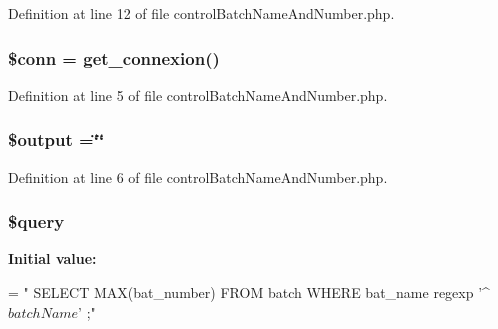 Definition at line 12 of file control\-Batch\-Name\-And\-Number.\-php.

\hypertarget{control_batch_name_and_number_8php_aa8a5a87b9c1a6a0819b88447cbe41877}{
\subsubsection[{\$conn}]{\setlength{\rightskip}{0pt plus 5cm}\$conn = {\bf get\-\_\-connexion}()}}\label{control_batch_name_and_number_8php_aa8a5a87b9c1a6a0819b88447cbe41877}


Definition at line 5 of file control\-Batch\-Name\-And\-Number.\-php.

\hypertarget{control_batch_name_and_number_8php_a73004ce9cd673c1bfafd1dc351134797}{
\subsubsection[{\$output}]{\setlength{\rightskip}{0pt plus 5cm}\$output =\char`\"{}\char`\"{}}}\label{control_batch_name_and_number_8php_a73004ce9cd673c1bfafd1dc351134797}


Definition at line 6 of file control\-Batch\-Name\-And\-Number.\-php.

\hypertarget{control_batch_name_and_number_8php_af59a5f7cd609e592c41dc3643efd3c98}{
\subsubsection[{\$query}]{\setlength{\rightskip}{0pt plus 5cm}\$query}}\label{control_batch_name_and_number_8php_af59a5f7cd609e592c41dc3643efd3c98}
{\bfseries Initial value\-:}
\begin{DoxyCode}
= \textcolor{stringliteral}{"}
\textcolor{stringliteral}{    SELECT }
\textcolor{stringliteral}{        MAX(bat\_number)}
\textcolor{stringliteral}{    FROM}
\textcolor{stringliteral}{        batch}
\textcolor{stringliteral}{    WHERE}
\textcolor{stringliteral}{        bat\_name regexp '^$batchName$'}
\textcolor{stringliteral}{    ;"}
\end{DoxyCode}


